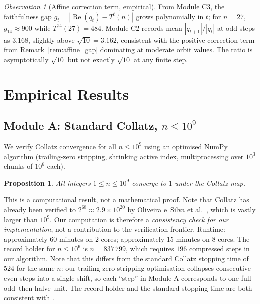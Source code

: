 \documentclass[12pt,reqno]{amsart}
\theoremstyle{plain}
\newtheorem{proposition}[theorem]{Proposition}
\theoremstyle{definition}
\theoremstyle{remark}
\newtheorem{observation}[theorem]{Observation}
\newcommand{\abs}[1]{\left|#1\right|}
\begin{document}
\begin{observation}[Affine correction term, empirical]
\label{obs:poly_gap}
From Module C3, the faithfulness gap
$g_t = |\operatorname{Re}(q_t) - T^t(n)|$ grows polynomially in $t$;
for $n = 27$, $g_{14} \approx 900$ while $T^{14}(27) = 484$.
Module C2 records mean $\abs{q_{t+1}}/\abs{q_t}$ at odd steps as
$3.168$, slightly above $\sqrt{10} = 3.162$, consistent with the
positive correction term from Remark~\ref{rem:affine_gap} dominating
at moderate orbit values.  The ratio is asymptotically $\sqrt{10}$
but not exactly $\sqrt{10}$ at any finite step.
\end{observation}

\section{Empirical Results}
\label{sec:empirical}

\subsection{Module A: Standard Collatz, \texorpdfstring{$n \leq 10^9$}{n <= 10\textasciicircum 9}}

We verify Collatz convergence for all $n \leq 10^9$ using an optimised
NumPy algorithm (trailing-zero stripping, shrinking active index,
multiprocessing over $10^3$ chunks of $10^6$ each).

\begin{proposition}
All integers $1 \leq n \leq 10^9$ converge to $1$ under the Collatz map.
\end{proposition}

This is a computational result, not a mathematical proof.
Note that Collatz has already been verified to $2^{68} \approx 2.9 \times 10^{20}$
by Oliveira e~Silva et al.\ \cite{Oliveira2010}, which is vastly larger than
$10^9$.  Our computation is therefore a \emph{consistency check for our
implementation}, not a contribution to the verification frontier.
Runtime: approximately $60$ minutes on $2$ cores; approximately $15$
minutes on $8$ cores.  The record holder for $n \leq 10^6$ is $n = 837\,799$,
which requires $196$ compressed steps in our algorithm.  Note that this
differs from the standard Collatz stopping time of $524$ for the same $n$:
our trailing-zero-stripping optimisation collapses consecutive even steps
into a single shift, so each ``step'' in Module A corresponds to one full
odd–then-halve unit.  The record holder and the standard stopping time
are both consistent with \cite{Oliveira2010}.
\end{document}
